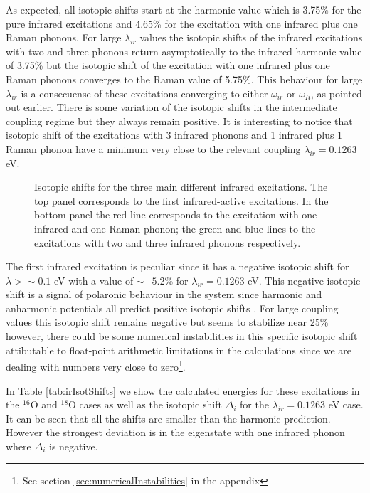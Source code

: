 As expected, all isotopic shifts start at the harmonic value which is 3.75\% for the pure infrared excitations and 4.65\% for the excitation with one infrared plus one Raman phonons.
For large $\lambda_{ir}$ values the isotopic shifts of the infrared excitations with two and three phonons return asymptotically to the infrared harmonic value of 3.75\% but the isotopic shift of the excitation with one infrared plus one Raman phonons converges to the Raman value of 5.75\%.
This behaviour for large $\lambda_{ir}$ is a consecuense of these excitations converging to either $\omega_{ir}$ or $\omega_R$, as pointed out earlier.
There is some variation of the isotopic shifts in the intermediate coupling regime but they always remain positive.
It is interesting to notice that isotopic shift of the excitations with 3 infrared phonons and 1 infrared plus 1 Raman phonon have a minimum very close to the relevant coupling $\lambda_{ir}=0.1263$ eV.
%
\begin{figure}[ht]
  \centering
  
  \caption[Isotopic shifts for the different infrared excitations.]
  {Isotopic shifts for the three main different infrared excitations.
  The top panel corresponds to the first infrared-active excitations.
  In the bottom panel the red line corresponds to the excitation with one infrared and one Raman phonon; the green and blue lines to the excitations with two and three infrared phonons respectively.}
  \label{fig:irIsot}
\end{figure}

The first infrared excitation is peculiar since it has a negative isotopic shift for $\lambda > \sim 0.1$ eV with a value of $\sim -5.2$\% for $\lambda_{ir}=0.1263$ eV.
This negative isotopic shift is a signal of polaronic behaviour in the system since harmonic and anharmonic potentials all predict positive isotopic shifts \cite{MustredeLeon2000,Pali1998}.
For large coupling values this isotopic shift remains negative but seems to stabilize near 25\% however, there could be some numerical instabilities in this specific isotopic shift attibutable to float-point arithmetic limitations in the calculations since we are dealing with numbers very close to zero\footnote{See section \ref{sec:numericalInstabilities} in the appendix}.

In Table \ref{tab:irIsotShifts} we show the calculated energies for these excitations in the $^{16}$O and $^{18}$O cases as well as the isotopic shift $\Delta_i$ for the $\lambda_{ir}=0.1263$ eV case. It can be seen that all the shifts are smaller than the harmonic prediction. However the strongest deviation is in the eigenstate with one infrared phonon where $\Delta_i$ is negative.

